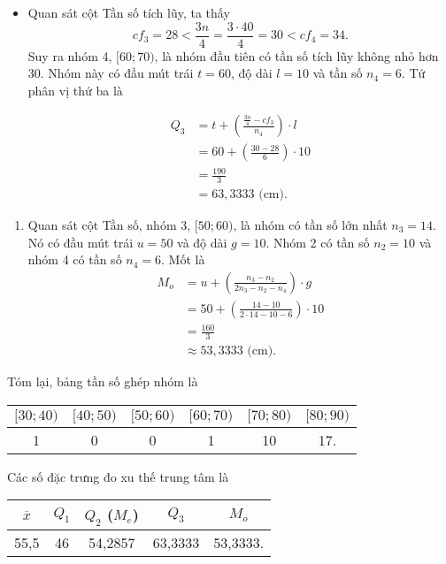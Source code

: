 \documentclass[
  letterpaper,
  DIV=11,
  numbers=noendperiod]{scrartcl}
\providecommand{\tightlist}{%
  \setlength{\itemsep}{0pt}\setlength{\parskip}{0pt}}\usepackage{longtable,booktabs,array}
\begin{document}
\begin{itemize}
\item
  Quan sát cột Tần số tích lũy, ta thấy \[
  cf_3=28<\frac{3n}{4}=\frac{3\cdot 40}{4}=30<cf_4=34.
  \] Suy ra nhóm 4, \([60;70)\), là nhóm đầu tiên có tần số tích lũy
  không nhỏ hơn 30. Nhóm này có đầu mút trái \(t=60\), độ dài \(l=10\)
  và tần số \(n_4=6\). Tứ phân vị thứ ba là

  \begin{align*}
        Q_3
            & = t + \left(\frac{\frac{3n}{4}-cf_3}{n_4}\right)\cdot l \\
            & = 60 + \left(\frac{30-28}{6}\right)\cdot 10 \\
            & = \frac{190}{3} \\
            & = 63,3333 \text{ (cm).}
    \end{align*}
\end{itemize}

\begin{enumerate}
\def\labelenumi{\alph{enumi}.}
\setcounter{enumi}{1}
\tightlist
\item
  Quan sát cột Tần số, nhóm 3, \([50;60)\), là nhóm có tần số lớn nhất
  \(n_3=14\). Nó có đầu mút trái \(u=50\) và độ dài \(g=10\). Nhóm 2 có
  tần số \(n_2=10\) và nhóm 4 có tần số \(n_4=6\). Mốt là \begin{align*}
       M_o
           & = u + \left(\frac{n_3-n_2}{2n_3-n_2-n_4}\right) \cdot g \\
           & = 50 + \left(\frac{14-10}{2\cdot 14-10-6}\right)\cdot 10 \\
           & = \frac{160}{3} \\
           & \approx 53,3333 \text{ (cm)}.
   \end{align*}
\end{enumerate}

Tóm lại, bảng tần số ghép nhóm là

\begin{center}
\begin{tabular}{|c|c|c|c|c|c|}
\hline 
$[30;40)$ & $[40;50)$ & $[50;60)$ & $[60;70)$ & $[70;80)$ & $[80;90)$  \\
\hline 
1 & 0 & 0 & 1 & 10 & 17. \\
\hline
\end{tabular}
\end{center}

Các số đặc trưng đo xu thế trung tâm là

\begin{center}
\begin{tabular}{|c|c|c|c|c|}
\hline
$\overline{x}$ & $Q_1$ & $Q_2$ ($M_e$) & $Q_3$ & $M_o$ \\
\hline
55,5 & 46 & 54,2857 & 63,3333 & 53,3333. \\
\hline 
\end{tabular}
\end{center}
\end{document}

